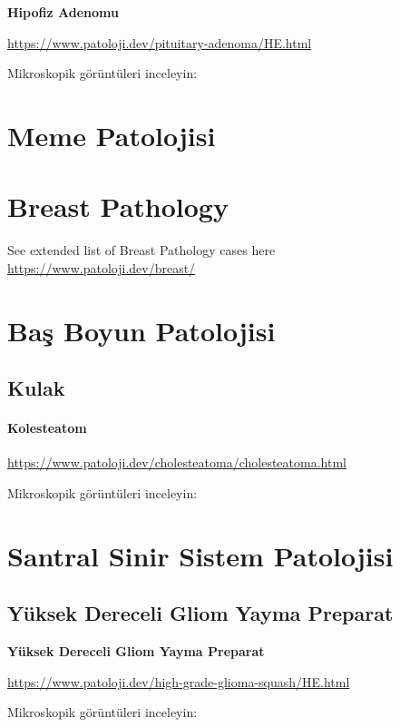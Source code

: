 \documentclass[
  letterpaper,
  DIV=11,
  numbers=noendperiod]{scrreprt}
\begin{document}
\textbf{Hipofiz Adenomu}

\url{https://www.patoloji.dev/pituitary-adenoma/HE.html}

Mikroskopik görüntüleri inceleyin:

\part{Meme Patolojisi}

\part{Breast Pathology}

See extended list of Breast Pathology cases here
\url{https://www.patoloji.dev/breast/}

\part{Baş Boyun Patolojisi}

\hypertarget{kulak}{%
\chapter{Kulak}\label{kulak}}

\hypertarget{kolesteatom}{%
\subsection{Kolesteatom}\label{kolesteatom}}

\url{https://www.patoloji.dev/cholesteatoma/cholesteatoma.html}

Mikroskopik görüntüleri inceleyin:

\part{Santral Sinir Sistem Patolojisi}

\hypertarget{yuxfcksek-dereceli-gliom-yayma-preparat}{%
\chapter{Yüksek Dereceli Gliom Yayma
Preparat}\label{yuxfcksek-dereceli-gliom-yayma-preparat}}

\textbf{Yüksek Dereceli Gliom Yayma Preparat}

\url{https://www.patoloji.dev/high-grade-glioma-squash/HE.html}

Mikroskopik görüntüleri inceleyin:
\end{document}
